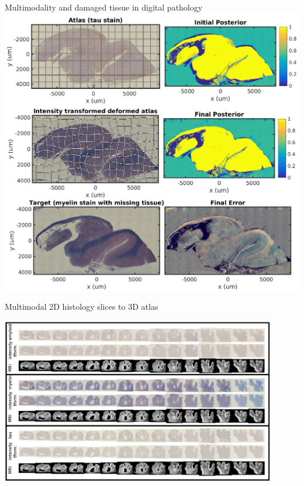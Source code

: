 \documentclass{beamer}
\begin{document}
\begin{frame}{Multimodality and damaged tissue in digital pathology}
\phantom{.}\hfill
\includegraphics[height=0.9\textheight]{missing_data_different_intensity_digital_pathology.png}
\hfill\phantom{.}
\end{frame}

\begin{frame}{Multimodal 2D histology slices to 3D atlas}

\phantom{.}\hfill
\includegraphics[width=0.9\textwidth]{all_slices.png}
\hfill\phantom{.}

\end{frame}
\end{document}
